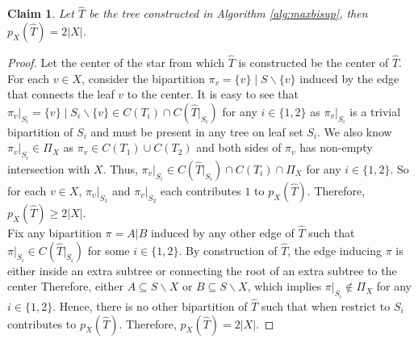 \documentclass{bmcart}
\newtheorem{claim}{Claim}
\begin{document}
\begin{claim} \label{claim:begin}
    Let $\hat{T}$ be the tree constructed in Algorithm \ref{alg:maxbisup}, then $p_X(\hat{T}) = 2 |X|$. 
\end{claim}
\begin{proof}
    Let the center of the star from which $\hat{T}$ is constructed be the center of $\hat{T}$. For each $v \in X$, consider the bipartition $\pi_v = \{v\}\mid S \backslash \{v\}$ induced by the edge that connects the leaf $v$ to the center. It is easy to see that $\pi_v|_{S_i} = \{v\} \mid S_i \backslash \{v\} \in C(T_i)\cap C(\hat{T}|_{S_i})$ for any $i\in\{1,2\}$ as $\pi_v|_{S_i}$ is a trivial bipartition of $S_i$ and must be present in any tree on leaf set $S_i$. We also know $\pi_v|_{S_i} \in \Pi_X$ as $\pi_v \in C(T_1)\cup C(T_2)$ and both sides of $\pi_v$ has non-empty intersection with $X$. Thus, $\pi_v|_{S_i} \in C(\hat{T}|_{S_i}) \cap C(T_i) \cap \Pi_X$ for any $i \in \{1,2\}$. So for each $v \in X$, $\pi_v|_{S_1}$ and $\pi_v|_{S_2}$ each contributes $1$ to $p_X(\hat{T})$. Therefore, $p_X(\hat{T}) \ge 2|X|$. \\
    
    Fix any bipartition $\pi = A|B$ induced by any other edge of $\hat{T}$ such that $\pi|_{S_i} \in C(\hat{T}|_{S_i})$ for some $i \in \{1,2\}$. By construction of $\hat{T}$, the edge inducing $\pi$ is either inside an extra subtree or connecting the root of an extra subtree to the center Therefore, either $A \subseteq S\backslash X $ or $B \subseteq S \backslash X$, which implies $\pi|_{S_i} \notin \Pi_X$ for any $i \in \{1,2\}$. Hence, there is no other bipartition of $\hat{T}$ such that when restrict to $S_i$ contributes to $p_X(\hat{T})$. Therefore, $p_X(\hat{T}) = 2|X|$.
\end{proof}
\end{document}
